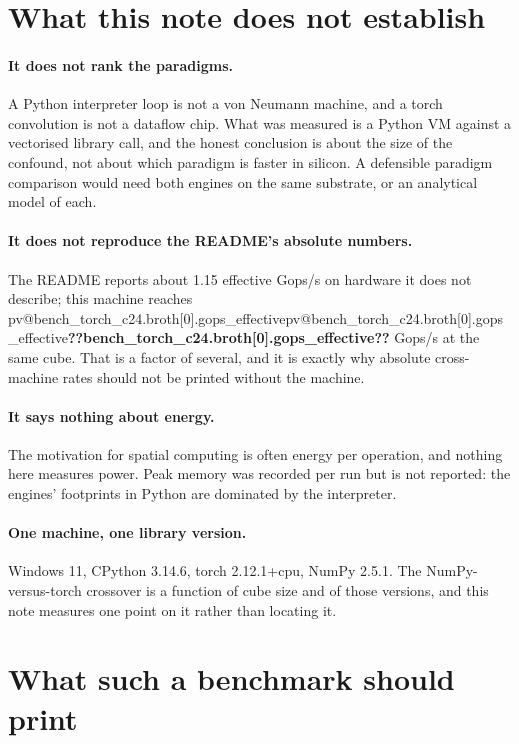 \documentclass[11pt,a4paper]{article}
\makeatletter
\newcommand{\val}[1]{\ifcsname pv@#1\endcsname\csname pv@#1\endcsname\else\textbf{??#1??}\fi}
\makeatother
\begin{document}
\section{What this note does not establish}
\label{sec:what}

\paragraph{It does not rank the paradigms.} A Python interpreter loop is not a von Neumann
machine, and a torch convolution is not a dataflow chip. What was measured is a Python VM against
a vectorised library call, and the honest conclusion is about the size of the confound, not about
which paradigm is faster in silicon. A defensible paradigm comparison would need both engines on
the same substrate, or an analytical model of each.

\paragraph{It does not reproduce the README's absolute numbers.} The README reports about 1.15 effective Gops/s on hardware it does not describe; this machine reaches \val{bench_torch_c24.broth[0].gops_effective}
Gops/s at the same cube. That is a factor of several, and it is exactly why absolute cross-machine
rates should not be printed without the machine.

\paragraph{It says nothing about energy.} The motivation for spatial computing is often energy per
operation, and nothing here measures power. Peak memory was recorded per run but is not reported:
the engines' footprints in Python are dominated by the interpreter.

\paragraph{One machine, one library version.} Windows 11, CPython 3.14.6, torch 2.12.1+cpu, NumPy
2.5.1. The NumPy-versus-torch crossover is a function of cube size and of those versions, and this
note measures one point on it rather than locating it.

\section{What such a benchmark should print}
\label{sec:recommend}
\end{document}
